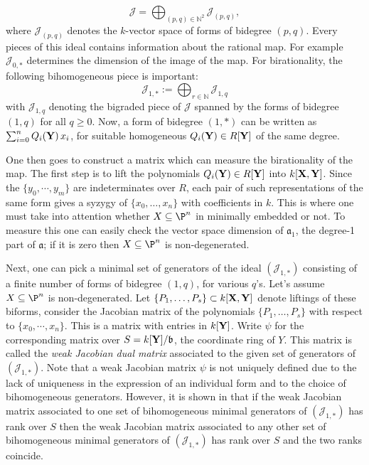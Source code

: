 \documentclass[11pt]{amsart}
\numberwithin{equation}{theorem}
\def\ff{{\bf f}}
\def\XX{{\bf X}}
\def\YY{{\bf Y}}
\renewcommand{\:}{\colon}
\DeclareMathOperator{\edim}{edim}
\theoremstyle{theorem}
\begin{document}

$${\mathcal J}=\bigoplus_{(p,q)\in \mathbb{N}^2} {\mathcal J}_{(p,q)},$$
where ${\mathcal J}_{(p,q)}$ denotes the $k$-vector space of forms of bidegree $(p,q)$.
Every pieces of this ideal contains information about the rational map. For example ${\mathcal J}_{0,*}$ determines the dimension of the image of the map.
For birationality, the following bihomogeneous piece is  important:
$${\mathcal J}_{1,*}:=\bigoplus_{r\in\mathbb{N}} {\mathcal J}_{1,q}$$
with ${\mathcal J}_{1,q}$ denoting the bigraded piece of ${\mathcal J}$ spanned by the forms of bidegree
 $(1,q)$ for all $q\geq 0$. Now, a form of bidegree $(1,*)$ can be written as $\sum_{i=0}^n Q_i(\YY)\,x_i$, for suitable homogeneous $Q_i(\YY)\in  R[\YY]$
of the same degree.

One then goes to construct a matrix which can measure the birationality of the map. The first step is to lift the polynomials $Q_i(\YY)\in  R[\YY]$ into $k[\XX,\YY]$.
Since the $\{y_0,\cdots,y_m\}$ are indeterminates over $R$, each pair of such representations of the same form gives a syzygy of $\{x_0,\ldots,x_n\}$
with coefficients in $k$.  This is where one must take into attention whether $X\subseteq \P^n$ in minimally embedded  or not. To measure this one can easily check the vector space dimension of ${\mathfrak a}_1$, the degree-1 part of $\mathfrak a$; if it is zero  then $X\subseteq \P^n$ is non-degenerated.



Next, one can pick a minimal set of generators of the ideal $({\mathcal J}_{1,*})$ consisting of a finite number
of forms of bidegree $(1,q)$, for various $q$'s.
Let's assume  $X\subseteq \P^n$ is non-degenerated. Let $\{P_1,\ldots,P_s\}\subset k[\XX,\YY]$ denote liftings of these biforms,
 consider the Jacobian matrix of the polynomials $\{P_1,\ldots,P_s\}$ with respect to $\{x_0,\cdots,x_n\}$. This is a matrix with entries in $k[\YY]$.
Write $\psi$ for the corresponding matrix over $S=k[\YY]/{\mathfrak b}$, the coordinate ring of $Y$. This matrix is called   the \emph{weak Jacobian dual matrix}  associated to
the given set of generators of $({\mathcal J}_{1,*})$.
Note that a weak Jacobian matrix $\psi$ is not uniquely defined due to the lack of uniqueness in the expression of
an individual form and to the choice of bihomogeneous generators. However, it is shown in \cite[Lemma 2.13]{DoriaHassanzadehSimisBirationality} that if the weak Jacobian matrix associated  to one set of bihomogeneous minimal generators of
$({\mathcal J}_{1,*})$ has  rank over $S$ then the weak Jacobian matrix associated to any other
set of bihomogeneous minimal generators of
$({\mathcal J}_{1,*})$ has  rank over $S$ and the two ranks coincide.
\end{document}
